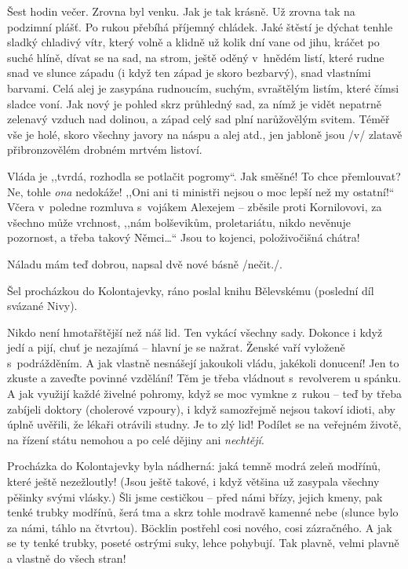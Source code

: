 Šest hodin večer. Zrovna byl venku. Jak je tak krásně. Už zrovna tak na podzimní plášť. Po rukou přebíhá příjemný chládek. Jaké štěstí je dýchat tenhle sladký chladivý vítr, který volně a klidně už kolik dní vane od jihu, kráčet po suché hlíně, dívat se na sad, na strom, ještě oděný v hnědém listí, které rudne snad ve slunce západu (i když ten západ je skoro bezbarvý), snad vlastními barvami. Celá alej je zasypána rudnoucím, suchým, svraštělým listím, které čímsi sladce voní. Jak nový je pohled skrz průhledný sad, za nímž je vidět nepatrně zelenavý vzduch nad dolinou, a západ celý sad plní narůžovělým svitem. Téměř vše je holé, skoro všechny javory na náspu a alej atd., jen jabloně jsou /v/ zlatavě přibronzovělém drobném mrtvém listoví.

Vláda je ,,tvrdá, rozhodla se potlačit pogromy``. Jak směšné! To chce přemlouvat? Ne, tohle \textit{ona} nedokáže! ,,Oni ani ti ministři nejsou o moc lepší než my ostatní!`` Včera v poledne rozmluva s vojákem Alexejem -- zběsile proti Kornilovovi, za všechno může vrchnost, ,,nám bolševikům, proletariátu, nikdo nevěnuje pozornost, a třeba takový Němci\ldots`` Jsou to kojenci, položivočišná chátra!

Náladu mám teď dobrou, napsal dvě nové básně /nečit./.

Šel procházkou do Kolontajevky, ráno poslal knihu Bělevskému (poslední díl svázané Nivy).

Nikdo není hmotařštější než náš lid. Ten vykácí všechny sady. Dokonce i když jedí a pijí, chuť je nezajímá -- hlavní je se nažrat. Ženské vaří vyloženě s podrážděním. A jak vlastně nesnášejí jakoukoli vládu, jakékoli donucení! Jen to zkuste a zaveďte povinné vzdělání! Těm je třeba vládnout s revolverem u spánku. A jak využijí každé živelné pohromy, když se moc vymkne z rukou -- teď by třeba zabíjeli doktory (cholerové vzpoury), i když samozřejmě nejsou takoví idioti, aby úplně uvěřili, že lékaři otrávili studny. Je to zlý lid! Podílet se na veřejném životě, na řízení státu nemohou a po celé dějiny ani \textit{nechtějí}.

Procházka do Kolontajevky byla nádherná: jaká temně modrá zeleň modřínů, které ještě nezežloutly! (Jsou ještě takové, i když většina už zasypala všechny pěšinky svými vlásky.) Šli jsme cestičkou -- před námi břízy, jejich kmeny, pak tenké trubky modřínů, šerá tma a skrz tohle modravě kamenné nebe (slunce bylo za námi, táhlo na čtvrtou). Böcklin postřehl cosi nového, cosi zázračného. A jak se ty tenké trubky, poseté ostrými suky, lehce pohybují. Tak plavně, velmi plavně a vlastně do všech stran!

